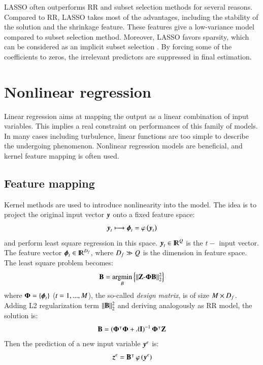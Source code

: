 LASSO often outperforms RR and subset selection methods for several reasons. Compared to RR, LASSO takes most of the advantages, including the stability of the solution and the shrinkage feature. These features give a low-variance model compared to subset selection method. Moreover, LASSO favors sparsity, which can be considered as an implicit subset selection \citep{hastie2005elements, hastie2009unsupervised}. By forcing some of the coefficients to zeros, the irrelevant predictors are suppressed in final estimation.

\section{Nonlinear regression}
\label{sec:nonlinear_regression}
Linear regression aims at mapping the output as a linear combination of input variables. This implies a real constraint on performances of this family of models. In many cases including turbulence, linear functions are too simple to describe the undergoing phenomenon. Nonlinear regression models are beneficial, and kernel feature mapping is often used.

\subsection{Feature mapping}
Kernel methods are used to introduce nonlinearity into the model. The idea is to project the original input vector $ \operatorname{\boldsymbol{y}}  $ onto a fixed feature space:
\begin{equation}
\operatorname{\boldsymbol{y}}_t \longmapsto \operatorname{\boldsymbol{\phi}}_t = \operatorname{ \varphi \left(\mathit{\operatorname{\boldsymbol{y}}_t}\right)}
\end{equation}
and perform least square regression in this space. $ \operatorname{\boldsymbol{y}}_t \in {\rm I\!R}^{Q}$ is the $ t- $ input vector. The feature vector $ \operatorname{\boldsymbol{\phi}}_t \in {\rm I\!R}^{D_f} $, where $ D_f \gg Q $ is the dimension in feature space. The least square problem becomes: 
\begin{equation}
\mathbf{B} = \operatorname*{\arg\!\min}_B{ \left\lbrace \operatorname{\Arrowvert \mathit{ \mathbf{Z}- \mathbf{\Phi}\mathbf{B}} \Arrowvert^2_2 } \right\rbrace}
\end{equation}
where $ \mathbf{\Phi} = \{\operatorname{\boldsymbol{\phi}}_t \} $ ($ t = 1, ..., M $), the so-called \textit{design matrix}, is of size $ M \times D_f $. Adding L2 regularization term $ \operatorname{\Arrowvert \mathit{\mathbf{B}} \Arrowvert^2_2 } $ and deriving analogously as RR model, the solution is:
\begin{equation}
\mathbf{B}=\left(\mathbf{\Phi}^{\intercal}\mathbf{\Phi} + \lambda \mathbf{I}\right)^{-1}\mathbf{\Phi}^{\intercal}\mathbf{Z}
\end{equation}
Then the prediction of a new input variable $ \operatorname{\boldsymbol{y}}^{e} $ is:
\begin{equation}
\operatorname{\boldsymbol{z}}^{e}=\mathbf{B}^{\intercal} \operatorname{ \varphi \left(\mathit{\operatorname{\boldsymbol{y}}^{e}}\right)}
\end{equation} 

